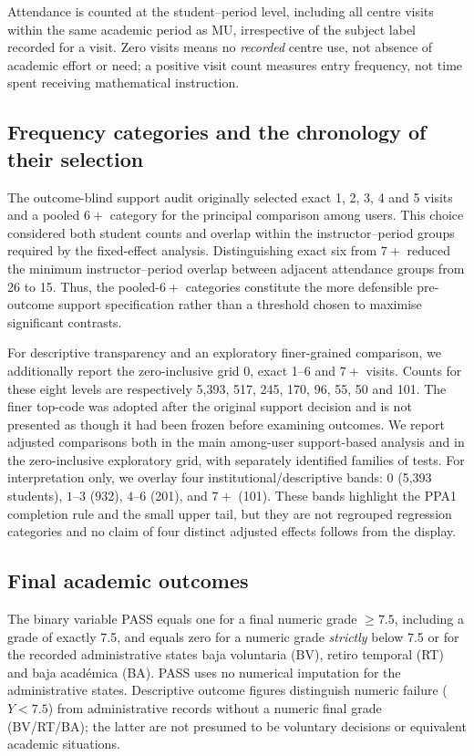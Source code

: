Attendance is counted at the student--period level, including all centre visits within the same academic period as MU, irrespective of the subject label recorded for a visit. Zero visits means no \emph{recorded} centre use, not absence of academic effort or need; a positive visit count measures entry frequency, not time spent receiving mathematical instruction.

\subsection{Frequency categories and the chronology of their selection}

The outcome-blind support audit originally selected exact 1, 2, 3, 4 and 5 visits and a pooled $6+$ category for the principal comparison among users. This choice considered both student counts and overlap within the instructor--period groups required by the fixed-effect analysis. Distinguishing exact six from $7+$ reduced the minimum instructor--period overlap between adjacent attendance groups from 26 to 15. Thus, the pooled-$6+$ categories constitute the more defensible pre-outcome support specification rather than a threshold chosen to maximise significant contrasts.

For descriptive transparency and an exploratory finer-grained comparison, we additionally report the zero-inclusive grid 0, exact 1--6 and $7+$ visits. Counts for these eight levels are respectively 5,393, 517, 245, 170, 96, 55, 50 and 101. The finer top-code was adopted after the original support decision and is not presented as though it had been frozen before examining outcomes. We report adjusted comparisons both in the main among-user support-based analysis and in the zero-inclusive exploratory grid, with separately identified families of tests. For interpretation only, we overlay four institutional/descriptive bands: $0$ (5,393 students), $1$--$3$ (932), $4$--$6$ (201), and $7+$ (101). These bands highlight the PPA1 completion rule and the small upper tail, but they are not regrouped regression categories and no claim of four distinct adjusted effects follows from the display.

\subsection{Final academic outcomes}

The binary variable PASS equals one for a final numeric grade $\geq7.5$, including a grade of exactly 7.5, and equals zero for a numeric grade \emph{strictly} below 7.5 or for the recorded administrative states baja voluntaria (BV), retiro temporal (RT) and baja acad\'emica (BA). PASS uses no numerical imputation for the administrative states. Descriptive outcome figures distinguish numeric failure ($Y<7.5$) from administrative records without a numeric final grade (BV/RT/BA); the latter are not presumed to be voluntary decisions or equivalent academic situations.

